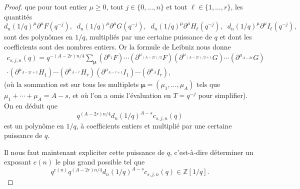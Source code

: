 \documentclass[12pt]{amsart}
\theoremstyle{remark}
\numberwithin{equation}{section}
\begin{document}
\begin{proof}
que pour tout entier 
$\mu\ge 0$, tout $j\in\{0,\ldots, n\}$ et tout $\ell\in\{1,\ldots, r\}$, les quantit{\'e}s 
\begin{equation*}
d_n(1/q)^{\mu}\partial^{\mu} F(q^{-j}),\;\; 
d_n(1/q)^{\mu}\partial^{\mu}G(q^{-j}),\;\;
d_n(1/q)^{\mu}\partial^{\mu}H_{\ell}(q^{-j}),\;\;
d_n(1/q)^{\mu}\partial^{\mu}I_{\ell}(q^{-j}),
\end{equation*}
sont des polyn{\^o}mes en $1/q$, multipli{\'e}s par une certaine puissance de
$q$ et dont 
les coefficients sont des nombres entiers. 
Or la formule de Leibniz nous
donne 
\begin{multline*}
c_{s,j,n}(q)=q^{-(A-2r)n/4}\sum_{\boldsymbol{\mu}}(\partial^{\mu_1}F)
\cdots(\partial ^{\mu_{(A-2r)/2}}F)
(\partial^{\mu_{(A-2r)/2+1}}G)\cdots (\partial^{\mu_{A-2r}}G)\\\cdot
(\partial^{\mu_{A-2r+1}}H_1)\cdots (\partial^{\mu_{A-r}}H_r)
(\partial^{\mu_{A-r+1}}I_1)\cdots (\partial^{\mu_{A}}I_r),
\end{multline*}
(o{\`u} la sommation est sur tous les multiplets
$\boldsymbol{\mu}=(\mu_1,\ldots,\mu_{A})$ tels que
$\mu_1+\cdots+\mu_{A}=A-s$, et o{\`u} l'on a omis l'{\'e}valuation en
$T=q^{-j}$ pour simplifier). On en d{\'e}duit que 
$$
q^{(A-2r)n/4}d_n(1/q)^{A-s}  c_{s,j,n}(q)
$$
est un polyn{\^o}me en $1/q$, {\`a} coefficients entiers et multipli{\'e} par une 
certaine puissance de $q$. 

Il nous faut maintenant 
expliciter cette puissance de $q$, c'est-{\`a}-dire d{\'e}terminer un exposant $e(n)$ le plus
grand possible tel que 
$$
q^{e(n)}q^{(A-2r)n/4}d_n(1/q)^{A-s}  c_{s,j,n}(q)\in \mathbb{Z}[1/q].
$$


\end{proof}
\end{document}
